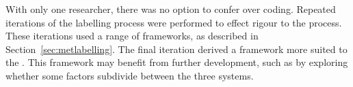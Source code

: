 With only one researcher, there was no option to confer over coding. Repeated iterations of the labelling process were performed to effect rigour to the process. These iterations used a range of frameworks, as described in Section~\ref{sec:metlabelling}. The final iteration derived a framework more suited to the \SPI. This framework may benefit from further development, such as by exploring whether some factors subdivide between the three systems.

